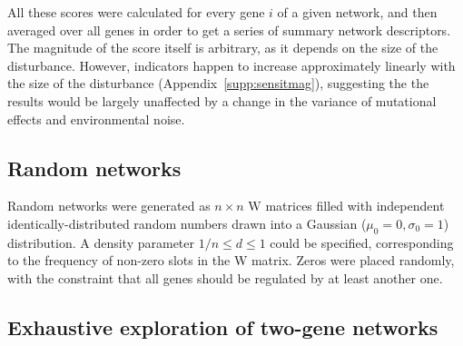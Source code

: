 \documentclass[10pt,a4paper]{article}
\newcommand{\W}{\bm{\mathrm W}}
\newcommand{\SupMat}{Appendix~}
\begin{document}
All these scores were calculated for every gene $i$ of a given network, and then averaged over all genes in order to get a series of summary network descriptors. The magnitude of the score itself is arbitrary, as it depends on the size of the disturbance. However, indicators happen to increase approximately linearly with the size of the disturbance (\SupMat \ref{supp:sensitmag}), suggesting the the results would be largely unaffected by a change in the variance of mutational effects and environmental noise. 

\subsection{Random networks}

Random networks were generated as $n\times n$ $\bm{\mathrm W}$ matrices filled with independent identically-distributed random numbers drawn into a Gaussian ($\mu_0 = 0, \sigma_0 = 1$) distribution.  A density parameter $1/n \leq d \leq 1$ could be specified, corresponding to the frequency of non-zero slots in the $\W$ matrix. Zeros were placed randomly, with the constraint that all genes should be regulated by at least another one. 

\subsection{Exhaustive exploration of two-gene networks}
\end{document}
